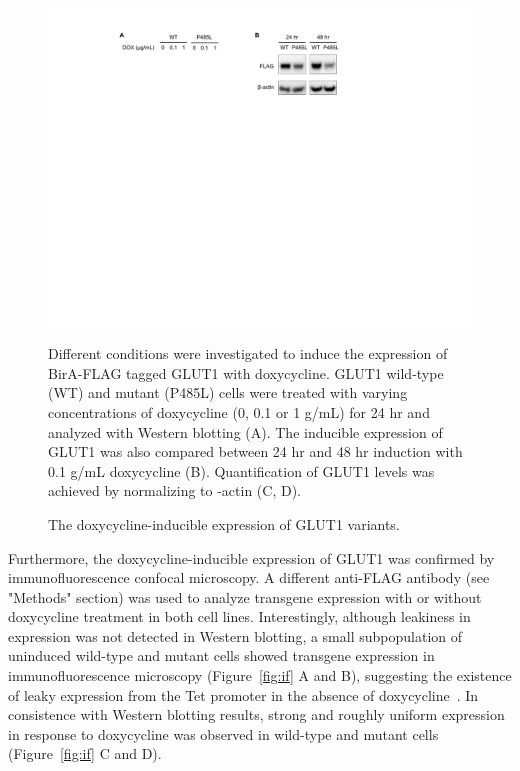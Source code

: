 \begin{figure}[h]
\centering
\includegraphics[scale=0.7]{Figures/WB}
\caption{The doxycycline-inducible expression of GLUT1 variants.}
\vspace*{-3mm}
\small \justify
Different conditions were investigated to induce the expression of BirA-FLAG tagged GLUT1 with doxycycline. GLUT1 wild-type (WT) and mutant (P485L) cells were treated with varying concentrations of doxycycline (0, 0.1 or 1 \textmu g/mL) for 24 hr and analyzed with Western blotting (A). The inducible expression of GLUT1 was also compared between 24 hr and 48 hr induction with 0.1 \textmu g/mL doxycycline (B). Quantification of GLUT1 levels was achieved by normalizing to \textbeta -actin (C, D).
\label{fig:wb}
\end{figure}
Furthermore, the doxycycline-inducible expression of GLUT1 was confirmed by immunofluorescence confocal microscopy. A different anti-FLAG antibody (see "Methods" section) was used to analyze transgene expression with or without doxycycline treatment in both cell lines. Interestingly, although leakiness in expression was not detected in Western blotting, a small subpopulation of uninduced wild-type and mutant cells showed transgene expression in immunofluorescence microscopy (Figure~\ref{fig:if} A and B), 
suggesting the existence of leaky expression from the Tet promoter in the absence of doxycycline~\cite{Pham,Senkel}. 
In consistence with Western blotting results, strong and roughly uniform expression in response to doxycycline was observed in wild-type and mutant cells (Figure~\ref{fig:if} C and D). 
